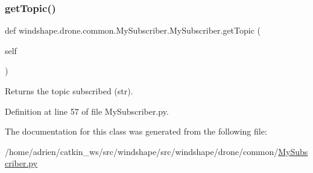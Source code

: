 \subsubsection{\texorpdfstring{get\+Topic()}{getTopic()}}
{\footnotesize\ttfamily def windshape.\+drone.\+common.\+My\+Subscriber.\+My\+Subscriber.\+get\+Topic (\begin{DoxyParamCaption}\item[{}]{self }\end{DoxyParamCaption})}

\begin{DoxyVerb}Returns the topic subscribed (str).\end{DoxyVerb}
 

Definition at line 57 of file My\+Subscriber.\+py.



The documentation for this class was generated from the following file\+:\begin{DoxyCompactItemize}
\item 
/home/adrien/catkin\+\_\+ws/src/windshape/src/windshape/drone/common/\mbox{\hyperlink{_my_subscriber_8py}{My\+Subscriber.\+py}}\end{DoxyCompactItemize}
